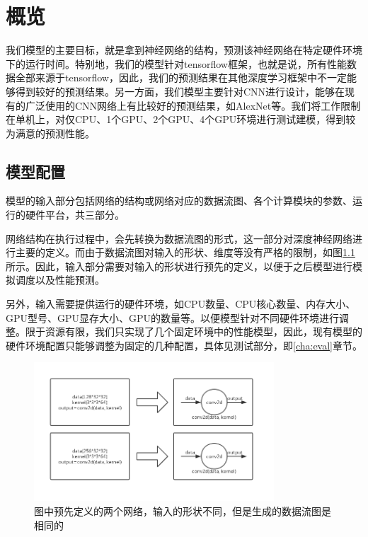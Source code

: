 \chapter{概览}
\label{cap:overview}
    我们模型的主要目标，就是拿到神经网络的结构，预测该神经网络在特定硬件环境下的运行时间。特别地，我们的模型针对tensorflow框架，也就是说，所有性能数据全部来源于tensorflow，因此，我们的预测结果在其他深度学习框架中不一定能够得到较好的预测结果。另一方面，我们模型主要针对CNN进行设计，能够在现有的广泛使用的CNN网络上有比较好的预测结果，如AlexNet\cite{alexnet}等。我们将工作限制在单机上，对仅CPU、1个GPU、2个GPU、4个GPU环境进行测试建模，得到较为满意的预测性能。
    
\section{模型配置}
    模型的输入部分包括网络的结构或网络对应的数据流图、各个计算模块的参数、运行的硬件平台，共三部分。
    
    网络结构在执行过程中，会先转换为数据流图的形式，这一部分对深度神经网络进行主要的定义。而由于数据流图对输入的形状、维度等没有严格的限制，如图\ref{fig:dag_same}所示。因此，输入部分需要对输入的形状进行预先的定义，以便于之后模型进行模拟调度以及性能预测。
    
    另外，输入需要提供运行的硬件环境，如CPU数量、CPU核心数量、内存大小、GPU型号、GPU显存大小、GPU的数量等。以便模型针对不同硬件环境进行调整。限于资源有限，我们只实现了几个固定环境中的性能模型，因此，现有模型的硬件环境配置只能够调整为固定的几种配置，具体见测试部分，即\ref{cha:eval}章节。

    \begin{figure}[!htbp]
        \centering
        \includegraphics[width=0.8\textwidth]{figures/dag_same.jpg}
        \caption{图中预先定义的两个网络，输入的形状不同，但是生成的数据流图是相同的}
        \label{fig:dag_same}
    \end{figure}
    
